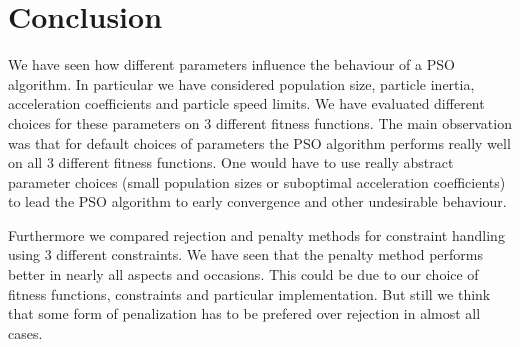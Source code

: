 \documentclass[12pt]{article}
\begin{document}
\FloatBarrier
\section{Conclusion}
We have seen how different parameters influence the behaviour of a PSO algorithm.
In particular we have considered population size, particle inertia, acceleration coefficients and particle speed limits.
We have evaluated different choices for these parameters on 3 different fitness functions.
The main observation was that for default choices of parameters the PSO algorithm performs really well on all 3 different fitness functions.
One would have to use really abstract parameter choices (small population sizes or suboptimal acceleration coefficients) to lead the PSO algorithm to early convergence and other undesirable behaviour.

Furthermore we compared rejection and penalty methods for constraint handling using 3 different constraints.
We have seen that the penalty method performs better in nearly all aspects and occasions.
This could be due to our choice of fitness functions, constraints and particular implementation.
But still we think that some form of penalization has to be prefered over rejection in almost all cases.
\end{document}
